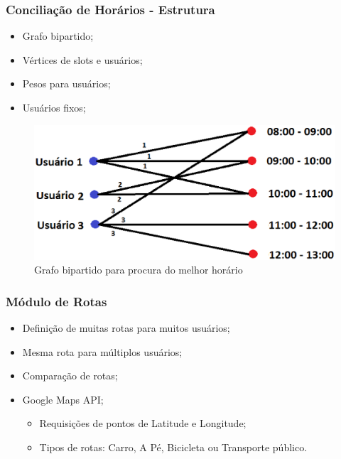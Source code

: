 \documentclass{beamer}
\begin{document}
\begin{frame}
\frametitle{Conciliação de Horários - Estrutura}

\begin{itemize}
	\item Grafo bipartido;
	\item Vértices de slots e usuários;
	\item Pesos para usuários;
	\item Usuários fixos;
\end{itemize}

\begin{figure}[h]
	\centering
	\includegraphics[scale=0.35]{figuras/melhor_horario.eps}
	\caption{Grafo bipartido para procura do melhor horário}
\end{figure}

\end{frame}

\begin{frame}
\frametitle{Módulo de Rotas}

\begin{itemize}
	\item Definição de muitas rotas para muitos usuários;
	\item Mesma rota para múltiplos usuários;
	\item Comparação de rotas;
	\item Google Maps API;
	\begin{itemize}
		\item Requisições de pontos de Latitude e Longitude;
		\item Tipos de rotas: Carro, A Pé, Bicicleta ou Transporte público.
	\end{itemize}
\end{itemize}

\end{frame}
\end{document}

